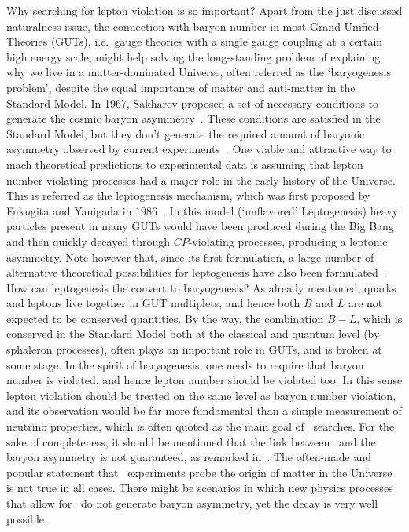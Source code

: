 Why searching for lepton violation is so important? Apart from the just discussed
naturalness issue, the connection with baryon number in most Grand Unified Theories
(GUTs), i.e.~gauge theories with a single gauge coupling at a certain high energy scale,
might help solving the long-standing problem of explaining why we live in a
matter-dominated Universe, often referred as the `baryogenesis problem', despite the equal
importance of matter and anti-matter in the Standard Model.  In 1967, Sakharov proposed a
set of necessary conditions to generate the cosmic baryon asymmetry~\cite{Sakharov1991}.
These conditions are satisfied in the Standard Model, but they don't generate the required
amount of baryonic asymmetry observed by current experiments~\cite{Zyla2020, Aghanim2018}.
One viable and attractive way to mach theoretical predictions to experimental data is
assuming that lepton number violating processes had a major role in the early history of
the Universe.  This is referred as the leptogenesis mechanism, which was first proposed by
Fukugita and Yanigada in 1986~\cite{Fukugita1986}. In this model (`unflavored'
Leptogenesis) heavy particles present in many GUTs would have been produced during the Big
Bang and then quickly decayed through $CP$-violating processes, producing a leptonic
asymmetry. Note however that, since its first formulation, a large number of alternative
theoretical possibilities for leptogenesis have also been formulated~\cite{?}.  How can
leptogenesis the convert to baryogenesis? As already mentioned, quarks and leptons live
together in GUT multiplets, and hence both $B$ and $L$ are not expected to be conserved
quantities. By the way, the combination $B−L$, which is conserved in the Standard Model
both at the classical and quantum level (by sphaleron processes), often plays an important
role in GUTs, and is broken at some stage.  In the spirit of baryogenesis, one needs to
require that baryon number is violated, and hence lepton number should be violated too. In
this sense lepton violation should be treated on the same level as baryon number
violation, and its observation would be far more fundamental than a simple measurement of
neutrino properties, which is often quoted as the main goal of \onbb\ searches.  For the
sake of completeness, it should be mentioned that the link between \onbb\ and the baryon
asymmetry is not guaranteed, as remarked in~\cite{Rodejohann2011}. The often-made and
popular statement that \onbb\ experiments probe the origin of matter in the Universe is
not true in all cases. There might be scenarios in which new physics processes that allow
for \onbb\ do not generate baryon asymmetry, yet the decay is very well possible.

